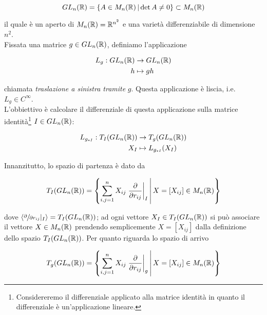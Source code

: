 \begin{equation}
	GL_{n}(\mathbb{R}) = \left\{ A \in M_{n}(\mathbb{R}) \, \middle| \, \det A \neq 0 \right\} \subset M_{n}(\mathbb{R})
\end{equation}

il quale è un aperto di $ M_{n}(\mathbb{R}) = \mathbb{R}^{n^{2}} $ e una varietà differenziabile di dimensione $ n^{2} $.\\
Fissata una matrice $ g \in GL_{n}(\mathbb{R}) $, definiamo l'applicazione

\begin{align}
	\begin{split}
		L_{g} : GL_{n}(\mathbb{R}) &\to GL_{n}(\mathbb{R})\\
		h &\mapsto g h
	\end{split}
\end{align}

chiamata \textit{traslazione a sinistra tramite} $ g $. Questa applicazione è liscia, i.e. $ L_{g} \in C^{\infty} $.\\
L'obbiettivo è calcolare il differenziale di questa applicazione sulla matrice identità\footnote{%
	Considereremo il differenziale applicato alla matrice identità in quanto il differenziale è un'applicazione lineare.%
} $ I \in GL_{n}(\mathbb{R}) $:

\begin{align}
	\begin{split}
		L_{g_{*I}} : T_{I}(GL_{n}(\mathbb{R})) &\to T_{g}(GL_{n}(\mathbb{R}))\\
		X_{I} &\mapsto L_{g_{*I}}(X_{I})
	\end{split}
\end{align}

Innanzitutto, lo spazio di partenza è dato da

\begin{equation}
	T_{I}(GL_{n}(\mathbb{R})) = \left\{ \sum_{i,j=1}^{n} X_{ij} \left. \dfrac{\partial}{\partial r_{ij}} \right|_{I} \, \middle| \, X=[X_{ij}] \in M_{n}(\mathbb{R}) \right\}
\end{equation}

dove $ \langle \sfrac{\partial}{\partial r_{ij}} |_{I} \rangle = T_{I}(GL_{n}(\mathbb{R})) $; ad ogni vettore $ X_{I} \in T_{I}(GL_{n}(\mathbb{R})) $ si può associare il vettore $ X \in M_{n}(\mathbb{R}) $ prendendo semplicemente $ X=[X_{ij}] $ dalla definizione dello spazio $ T_{I}(GL_{n}(\mathbb{R})) $. Per quanto riguarda lo spazio di arrivo

\begin{equation}
	T_{g}(GL_{n}(\mathbb{R})) = \left\{ \sum_{i,j=1}^{n} X_{ij} \left. \dfrac{\partial}{\partial r_{ij}} \right|_{g} \, \middle| \, X=[X_{ij}] \in M_{n}(\mathbb{R}) \right\}
\end{equation}

